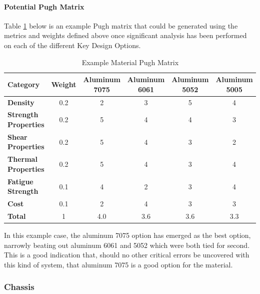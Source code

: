 \documentclass{ece}
\begin{document}
\paragraph{Potential Pugh Matrix}

Table \ref{tbl:material_Pugh} below is an example Pugh matrix that could be generated using the metrics and weights defined above once significant analysis has been performed on each of the different Key Design Options. 
\begin{table}[H]
\centering
\begin{tabular}{|l|c|c|c|c|c|} 
\hline
    \textbf{Category} & \textbf{Weight} & \textbf{Aluminum 7075} & \textbf{Aluminum 6061} & \textbf{Aluminum 5052} & \textbf{Aluminum 5005}
    \\
\hline
    \textbf{Density} & 0.2 & 2 & 3 & 5 & 4
    \\
\hline
    \textbf{Strength Properties} & 0.2 & 5 & 4 & 4 & 3 
    \\
\hline
    \textbf{Shear Properties} & 0.2 & 5 & 4 & 3 & 2 
    \\
\hline
    \textbf{Thermal Properties} & 0.2 & 5 & 4 & 3 & 4
    \\
\hline
    \textbf{Fatigue Strength} & 0.1 & 4 & 2 & 3 & 4 
    \\
\hline
    \textbf{Cost} & 0.1 & 2 & 4 & 3 & 3 
    \\
\hline
    \textbf{Total} & 1 & 4.0 & 3.6 & 3.6 & 3.3 
    \\
\hline
\end{tabular}
\caption{Example Material Pugh Matrix }
\label{tbl:material_Pugh}
\end{table}

In this example case, the aluminum 7075 option has emerged as the best option, narrowly beating out aluminum 6061 and 5052 which were both tied for second. This is a good indication that, should no other critical errors be uncovered with this kind of system, that aluminum 7075 is a good option for the material.


\subsubsection{Chassis}
\end{document}
